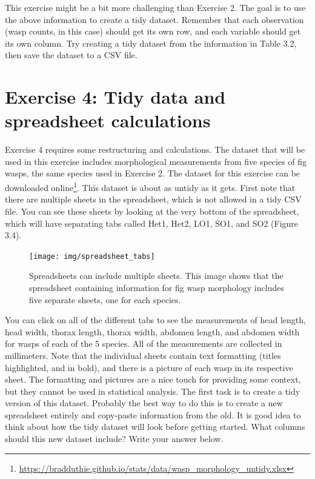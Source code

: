 \documentclass[
  openany]{scrbook}
\begin{document}
This exercise might be a bit more challenging than Exercise 2.
The goal is to use the above information to create a tidy dataset.
Remember that each observation (wasp counts, in this case) should get its own row, and each variable should get its own column.
Try creating a tidy dataset from the information in Table 3.2, then save the dataset to a CSV file.

\hypertarget{exercise-4-tidy-data-and-spreadsheet-calculations}{%
\section{Exercise 4: Tidy data and spreadsheet calculations}\label{exercise-4-tidy-data-and-spreadsheet-calculations}}

Exercise 4 requires some restructuring and calculations.
The dataset that will be used in this exercise includes morphological measurements from five species of fig wasps, the same species used in Exercise 2.
The dataset for this exercise can be downloaded online\footnote{\url{https://bradduthie.github.io/stats/data/wasp_morphology_untidy.xlsx}}.
This dataset is about as untidy as it gets.
First note that there are multiple sheets in the spreadsheet, which is not allowed in a tidy CSV file.
You can see these sheets by looking at the very bottom of the spreadsheet, which will have separating tabs called Het1, Het2, LO1, SO1, and SO2 (Figure 3.4).

\begin{figure}
\texttt{[image: img/spreadsheet\_tabs]} \caption{Spreadsheets can include multiple sheets. This image shows that the spreadsheet containing information for fig wasp morphology includes five separate sheets, one for each species.}\label{fig:unnamed-chunk-19}
\end{figure}

You can click on all of the different tabs to see the measurements of head length, head width, thorax length, thorax width, abdomen length, and abdomen width for wasps of each of the 5 species.
All of the measurements are collected in millimeters.
Note that the individual sheets contain text formatting (titles highlighted, and in bold), and there is a picture of each wasp in its respective sheet.
The formatting and pictures are a nice touch for providing some context, but they cannot be used in statistical analysis.
The first task is to create a tidy version of this dataset.
Probably the best way to do this is to create a new spreadsheet entirely and copy-paste information from the old.
It is good idea to think about how the tidy dataset will look before getting started.
What columns should this new dataset include? Write your answer below.
\end{document}
